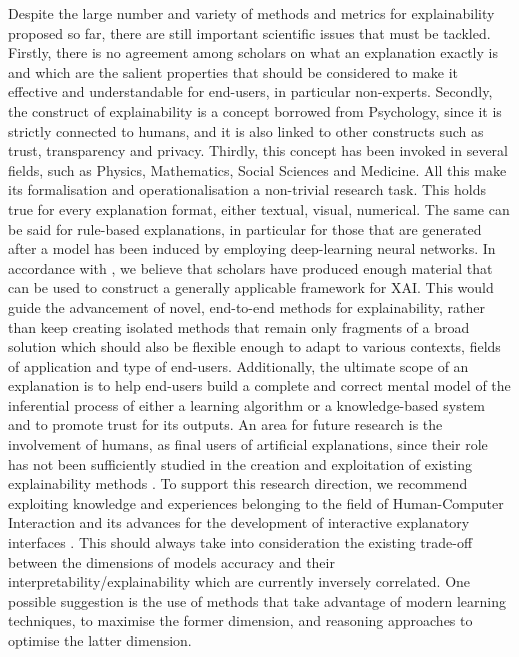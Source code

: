 \documentclass[final,1p,times]{elsarticle}
\begin{document}
Despite the large number and variety of methods and metrics for explainability proposed so far, there are still important scientific issues that must be tackled. 
Firstly, there is no agreement among scholars on what an explanation exactly is and which are the salient properties that should be considered to make it effective and understandable for end-users, in particular non-experts. 
Secondly, the construct of explainability is a concept borrowed from Psychology, since it is strictly connected to humans, and it is also linked to other constructs such as trust, transparency and privacy.
Thirdly, this concept has been invoked in several fields, such as Physics, Mathematics, Social Sciences and Medicine.
All this make its formalisation and operationalisation a non-trivial research task.
This holds true for every explanation format, either textual, visual,  numerical. The same can be said for rule-based explanations, in particular for those that are generated after a model has been induced by employing deep-learning neural networks.  
In accordance with \cite{adadi2018peeking}, we believe that scholars have produced enough material that can be used to construct a generally applicable framework for XAI. This would guide the advancement of novel, end-to-end methods for explainability, rather than keep creating isolated methods that remain only fragments of a broad solution which should also be flexible enough to adapt to various contexts, fields of application and type of end-users. 
Additionally, the ultimate scope of an explanation is to help end-users build a complete and correct mental model of the inferential process of either a learning algorithm or a knowledge-based system and to promote trust for its outputs.
An area for future research is the involvement of humans, as final users of artificial explanations, since their role has not been sufficiently studied in the creation and exploitation of existing explainability methods \cite{adadi2018peeking}. 
To support this research direction, we recommend exploiting knowledge and experiences belonging to the field of Human-Computer Interaction and its advances for the development of interactive explanatory interfaces \cite{lawless2019artificial}.
This should always take into consideration the existing trade-off between the dimensions of models accuracy and their interpretability/explainability which are currently inversely correlated.
One possible suggestion is the use of methods that take advantage of modern learning techniques, to maximise the former dimension, and reasoning approaches to optimise the latter dimension.
\end{document}
